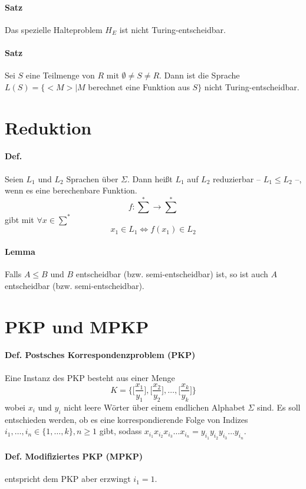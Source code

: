 \paragraph*{Satz} Das spezielle Halteproblem $H_E$ ist nicht Turing-entscheidbar.
\paragraph*{Satz} Sei $S$ eine Teilmenge von $R$ mit $\emptyset\not=S\not=R$. Dann ist die Sprache $L(S)=\{<M>|M$ berechnet eine Funktion aus $S\}$ nicht Turing-entscheidbar.


\section{Reduktion}
\paragraph*{Def.} Seien $L_1$ und $L_2$ Sprachen über $\Sigma$. Dann heißt $L_1$ auf $L_2$ reduzierbar -- $L_1 \leq L_2$ --, wenn es eine berechenbare Funktion. $$ f: \sum^* \rightarrow \sum^* $$ gibt mit $\forall x \in \sum^*$ $$ x_1 \in L_1 \Leftrightarrow f(x_1) \in L_2 $$
\paragraph*{Lemma} Falls $A \leq B$ und $B$ entscheidbar (bzw. semi-entscheidbar) ist, so ist auch $A$ entscheidbar (bzw. semi-entscheidbar).


\section{PKP und MPKP}
\paragraph*{Def. Postsches Korrespondenzproblem (PKP)} Eine Instanz des PKP besteht aus einer Menge $$ K=\Bigg\{ \Bigg[\frac{x_1}{y_1}\Bigg], \Bigg[\frac{x_2}{y_2}\Bigg], \dots, \Bigg[\frac{x_k}{y_k}\Bigg] \Bigg\} $$ wobei $x_i$ und $y_i$ nicht leere Wörter über einem endlichen Alphabet $\Sigma$ sind. Es soll entschieden werden, ob es eine korrespondierende Folge von Indizes $i_1,\dots,i_n \in \{ 1,\dots,k \}, n \geq 1$ gibt, sodass $x_{i_1}x_{i_2}x_{i_3}\dots x_{i_n} = y_{i_1}y_{i_2}y_{i_3}\dots y_{i_n}$.
\paragraph*{Def. Modifiziertes PKP (MPKP)} entspricht dem PKP aber erzwingt $i_1 = 1$.

